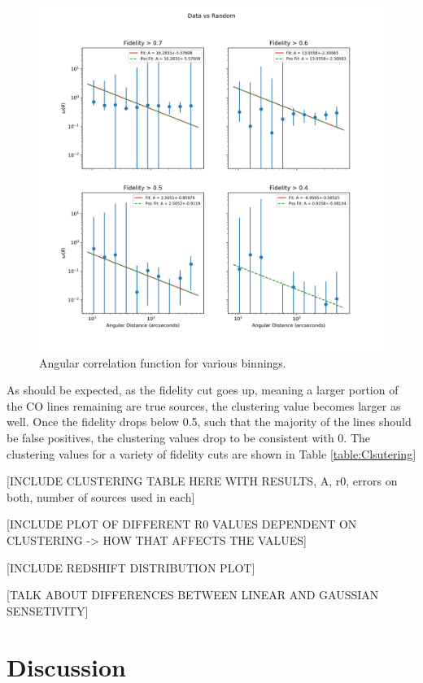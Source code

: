 \begin{figure}[tbp]
\centering \includegraphics[width=120mm]{Fidelity/Log_4Panel_Data_Vs_Random_bin10_NFalse_Num10000.png}
\caption{Angular correlation function for various binnings.}
\label{fig:Angular_binnings}
\end{figure}

As should be expected, as the fidelity cut goes up, meaning a larger portion of the CO lines remaining are true sources, the clustering value becomes larger as well. Once the fidelity drops below 0.5, such that the majority of the lines should be false positives, the clustering values drop to be consistent with 0. The clustering values for a variety of fidelity cuts are shown in Table \ref{table:Clsutering}

[INCLUDE CLUSTERING TABLE HERE WITH RESULTS, A, r0, errors on both, number of sources used in each] \label{table:Clustering}

[INCLUDE PLOT OF DIFFERENT R0 VALUES DEPENDENT ON CLUSTERING -> HOW THAT AFFECTS THE VALUES]

[INCLUDE REDSHIFT DISTRIBUTION PLOT]

[TALK ABOUT DIFFERENCES BETWEEN LINEAR AND GAUSSIAN SENSETIVITY]

\section{Discussion}

